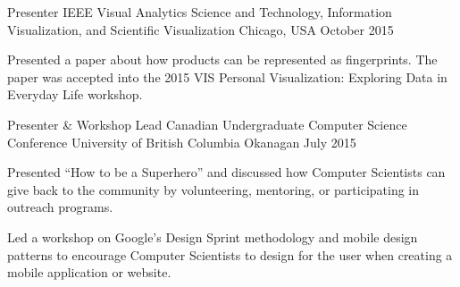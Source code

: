 \begin{cventries}
  \cventry
    {Presenter}
    {IEEE Visual Analytics Science and Technology, Information Visualization, and Scientific Visualization}
    {Chicago, USA}
    {October 2015}
    {
      \begin{cvitems}
        \item {Presented a paper about how products can be represented as fingerprints. The paper was accepted into the 2015 VIS Personal Visualization: Exploring Data in Everyday Life workshop.}
      \end{cvitems}
    }
  \cventry
    {Presenter \& Workshop Lead}
    {Canadian Undergraduate Computer Science Conference}
    {University of British Columbia Okanagan}
    {July 2015}
    {
      \begin{cvitems}
        \item {Presented ``How to be a Superhero'' and discussed how Computer Scientists can give back to the community by volunteering, mentoring, or participating in outreach programs.}
        \item {Led a workshop on Google’s Design Sprint methodology and mobile design patterns to encourage Computer Scientists to design for the user when creating a mobile application or website.}
      \end{cvitems}
    }
\end{cventries}
